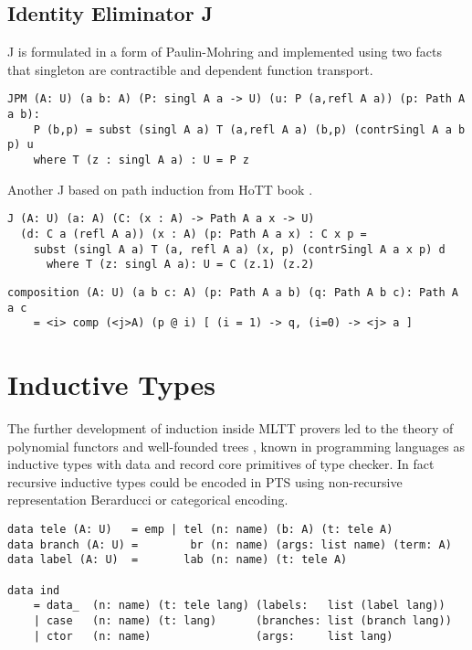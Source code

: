 \documentclass{aip-cp}
\begin{document}
\subsection*{Identity Eliminator J}

J is formulated in a form of Paulin-Mohring and implemented
using two facts that singleton are contractible and dependent function transport.

\begin{lstlisting}[mathescape=true]
JPM (A: U) (a b: A) (P: singl A a -> U) (u: P (a,refl A a)) (p: Path A a b):
    P (b,p) = subst (singl A a) T (a,refl A a) (b,p) (contrSingl A a b p) u
    where T (z : singl A a) : U = P z
\end{lstlisting}

Another J based on path induction from HoTT book \cite{HoTT13}.

\begin{lstlisting}[mathescape=true]
J (A: U) (a: A) (C: (x : A) -> Path A a x -> U)
  (d: C a (refl A a)) (x : A) (p: Path A a x) : C x p =
    subst (singl A a) T (a, refl A a) (x, p) (contrSingl A a x p) d
      where T (z: singl A a): U = C (z.1) (z.2)
\end{lstlisting}

\begin{lstlisting}[mathescape=true]
composition (A: U) (a b c: A) (p: Path A a b) (q: Path A b c): Path A a c
    = <i> comp (<j>A) (p @ i) [ (i = 1) -> q, (i=0) -> <j> a ]
\end{lstlisting}

\section{Inductive Types}

The further development of induction \cite{Dybjer94,Vene00} inside MLTT provers led
to the theory of polynomial functors and well-founded trees \cite{Gambino03},
known in programming languages as inductive types with data
and record core primitives of type checker. In fact recursive inductive
types \cite{Wadler90} could be encoded in PTS using non-recursive representation
Berarducci \cite {Bohm85} or categorical encoding.

\begin{lstlisting}[mathescape=true]
data tele (A: U)   = emp | tel (n: name) (b: A) (t: tele A)
data branch (A: U) =        br (n: name) (args: list name) (term: A)
data label (A: U)  =       lab (n: name) (t: tele A)

data ind
    = data_  (n: name) (t: tele lang) (labels:   list (label lang))
    | case   (n: name) (t: lang)      (branches: list (branch lang))
    | ctor   (n: name)                (args:     list lang)
\end{lstlisting}
\end{document}
